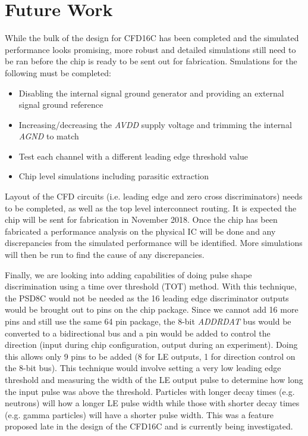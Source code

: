 \documentclass[12pt,oneside,final]{siuethesis}
\theoremstyle{definition}
\begin{document}
\section{Future Work}
\par While the bulk of the design for CFD16C has been completed and the simulated performance looks promising, more robust and detailed simulations still need to be ran before the chip is ready to be sent out for fabrication. Smulations for the following must be completed:
\begin{itemize}
\item Disabling the internal signal ground generator and providing an external signal ground reference
\item Increasing/decreasing the \emph{AVDD} supply voltage and trimming the internal \emph{AGND} to match
\item Test each channel with a different leading edge threshold value
\item Chip level simulations including parasitic extraction
\end{itemize}
Layout of the CFD circuits (i.e. leading edge and zero cross discriminators) needs to be completed, as well as the top level interconnect routing. It is expected the chip will be sent for fabrication in November 2018. Once the chip has been fabricated a performance analysis on the physical IC will be done and any discrepancies from the simulated performance will be identified. More simulations will then be run to find the cause of any discrepancies. 
\par Finally, we are looking into adding capabilities of doing pulse shape discrimination using a time over threshold  (TOT) method. With this technique, the PSD8C would not be needed as the 16 leading edge discriminator outputs would be brought out to pins on the chip package. Since we cannot add 16 more pins and still use the same 64 pin package, the 8-bit \emph{ADDRDAT} bus would be converted to a bidirectional bus and a pin would be added to control the direction (input during chip configuration, output during an experiment). Doing this allows only 9 pins to be added (8 for LE outputs, 1 for direction control on the 8-bit bus). This technique would involve setting a very low leading edge threshold and measuring the width of the LE output pulse to determine how long the input pulse was above the threshold. Particles with longer decay times (e.g. neutrons) will how a longer LE pulse width while those with shorter decay times (e.g. gamma particles) will have a shorter pulse width. This was a feature proposed late in the design of the CFD16C and is currently being investigated.
\end{document}
